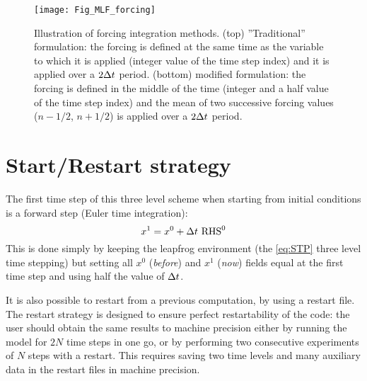 \documentclass[../main/NEMO_manual]{subfiles}
\begin{document}
\begin{figure}[!t]
  \begin{center}
    \texttt{[image: Fig\_MLF\_forcing]}
    \caption{
      \protect\label{fig:MLF_forcing}
      Illustration of forcing integration methods.
      (top) ''Traditional'' formulation:
      the forcing is defined at the same time as the variable to which it is applied
      (integer value of the time step index) and it is applied over a $2\Delta t$ period.
      (bottom)  modified formulation:
      the forcing is defined in the middle of the time (integer and a half value of the time step index) and
      the mean of two successive forcing values ($n-1/2$, $n+1/2$) is applied over a $2\Delta t$ period.
    }
  \end{center}
\end{figure}

\section{Start/Restart strategy}
\label{sec:STP_rst}


The first time step of this three level scheme when starting from initial conditions is a forward step
(Euler time integration):
\[
  x^1 = x^0 + \Delta t \ \text{RHS}^0
\]
This is done simply by keeping the leapfrog environment (\ie the \autoref{eq:STP} three level time stepping) but
setting all $x^0$ (\textit{before}) and $x^{1}$ (\textit{now}) fields equal at the first time step and
using half the value of $\Delta t$.

It is also possible to restart from a previous computation, by using a restart file.
The restart strategy is designed to ensure perfect restartability of the code:
the user should obtain the same results to machine precision either by
running the model for $2N$ time steps in one go,
or by performing two consecutive experiments of $N$ steps with a restart.
This requires saving two time levels and many auxiliary data in the restart files in machine precision. 
\end{document}
